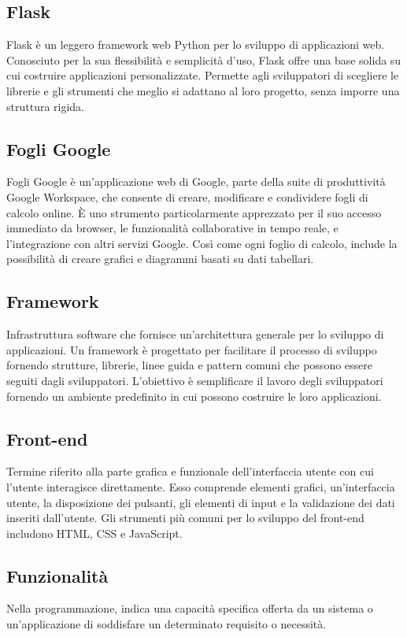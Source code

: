 \hypertarget{sec:flask}{}
\subsection*{Flask}
Flask è un leggero framework web Python per lo sviluppo di applicazioni web. Conosciuto per la sua flessibilità e semplicità d'uso, 
Flask offre una base solida su cui costruire applicazioni personalizzate. Permette agli sviluppatori di scegliere le librerie e gli 
strumenti che meglio si adattano al loro progetto, senza imporre una struttura rigida.

\subsection*{Fogli Google}
Fogli Google è un'applicazione web di Google, parte della suite di produttività Google Workspace, che consente di creare, modificare e condividere fogli 
di calcolo online. È uno strumento particolarmente apprezzato per il suo accesso immediato da browser, le funzionalità collaborative in tempo reale, e 
l'integrazione con altri servizi Google. Così come ogni foglio di calcolo, include la possibilità di creare grafici e diagrammi basati su dati tabellari.

\hypertarget{sec:framework}{}
\subsection*{Framework}
Infrastruttura software che fornisce un’architettura generale per lo sviluppo di applicazioni. Un framework è progettato per facilitare il processo di 
sviluppo fornendo strutture, librerie, linee guida e pattern comuni che possono essere seguiti dagli sviluppatori. L’obiettivo è semplificare il lavoro 
degli sviluppatori fornendo un ambiente predefinito in cui possono costruire le loro applicazioni.

\hypertarget{sec:front-end}{}
\subsection*{Front-end}
Termine riferito alla parte grafica e funzionale dell’interfaccia utente con cui l’utente interagisce direttamente. 
Esso comprende elementi grafici, un’interfaccia utente, la disposizione dei pulsanti, gli elementi di input e la 
validazione dei dati inseriti dall’utente. Gli strumenti più comuni per lo sviluppo del front-end includono HTML, 
CSS e JavaScript.

\hypertarget{sec:funzionalità}{}
\subsection*{Funzionalità}
Nella programmazione, indica una capacità specifica offerta da un sistema o un'applicazione di soddisfare un determinato requisito o necessità.

\newpage